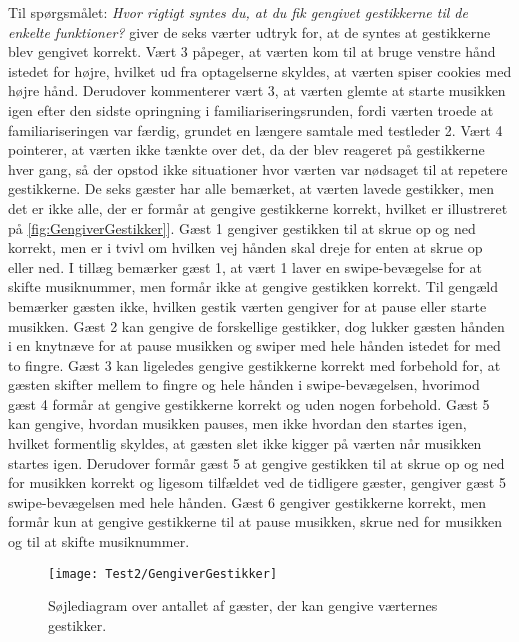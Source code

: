 Til spørgsmålet: \textit{Hvor rigtigt syntes du, at du fik gengivet gestikkerne til de enkelte funktioner?} giver de seks værter udtryk for, at de syntes at gestikkerne blev gengivet korrekt. Vært 3 påpeger, at værten kom til at bruge venstre hånd istedet for højre, hvilket ud fra optagelserne skyldes, at værten spiser cookies med højre hånd. Derudover kommenterer vært 3, at værten glemte at starte musikken igen efter den sidste opringning i familiariseringsrunden, fordi værten troede at familiariseringen var færdig, grundet en længere samtale med testleder 2. Vært 4 pointerer, at værten ikke tænkte over det, da der blev reageret på gestikkerne hver gang, så der opstod ikke situationer hvor værten var nødsaget til at repetere gestikkerne. \blankline
%
De seks gæster har alle bemærket, at værten lavede gestikker, men det er ikke alle, der er formår at gengive gestikkerne korrekt, hvilket er illustreret på \autoref{fig:GengiverGestikker}]. Gæst 1 gengiver gestikken til at skrue op og ned korrekt, men er i tvivl om hvilken vej hånden skal dreje for enten at skrue op eller ned. I tillæg bemærker gæst 1, at vært 1 laver en swipe-bevægelse for at skifte musiknummer, men formår ikke at gengive gestikken korrekt. Til gengæld bemærker gæsten ikke, hvilken gestik værten gengiver for at pause eller starte musikken. Gæst 2 kan gengive de forskellige gestikker, dog lukker gæsten hånden i en knytnæve for at pause musikken og swiper med hele hånden istedet for med to fingre. Gæst 3 kan ligeledes gengive gestikkerne korrekt med forbehold for, at gæsten skifter mellem to fingre og hele hånden i swipe-bevægelsen, hvorimod gæst 4 formår at gengive gestikkerne korrekt og uden nogen forbehold. Gæst 5 kan gengive, hvordan musikken pauses, men ikke hvordan den startes igen, hvilket formentlig skyldes, at gæsten slet ikke kigger på værten når musikken startes igen. Derudover formår gæst 5 at gengive gestikken til at skrue op og ned for musikken korrekt og ligesom tilfældet ved de tidligere gæster, gengiver gæst 5 swipe-bevægelsen med hele hånden. Gæst 6 gengiver gestikkerne korrekt, men formår kun at gengive gestikkerne til at pause musikken, skrue ned for musikken og til at skifte musiknummer. 
%
\begin{figure}[H]
	\centering
	\texttt{[image: Test2/GengiverGestikker]}
	\caption{Søjlediagram over antallet af gæster, der kan gengive værternes gestikker.}
	\label{fig:GengiverGestikker}
\end{figure}
\noindent
% 
